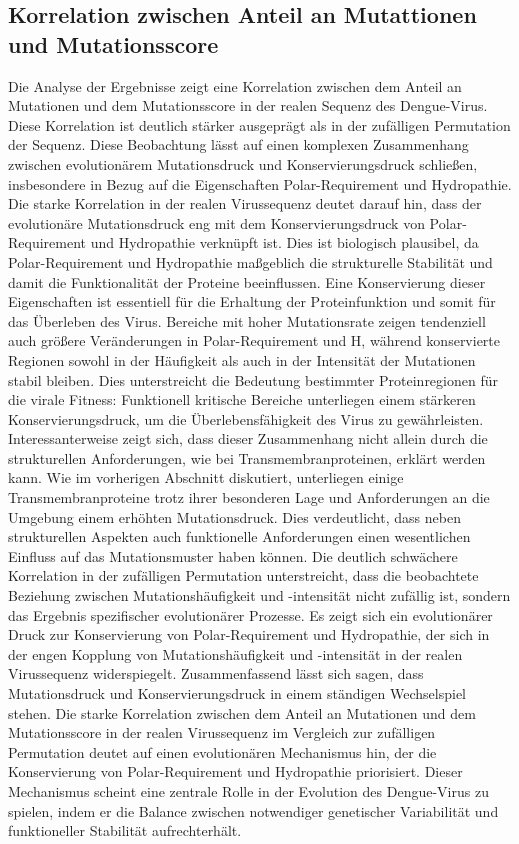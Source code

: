 \documentclass[german,version-2022-01]{uzl-thesis}
\begin{document}
\subsection{Korrelation zwischen Anteil an Mutattionen und Mutationsscore}
Die Analyse der Ergebnisse zeigt eine Korrelation zwischen dem Anteil an Mutationen und dem Mutationsscore in der realen Sequenz des Dengue-Virus. Diese Korrelation ist deutlich st\"arker ausgepr\"agt als in der zuf\"alligen Permutation der Sequenz. Diese Beobachtung l\"asst auf einen komplexen Zusammenhang zwischen evolution\"arem Mutationsdruck und Konservierungsdruck schlie\ss{}en, insbesondere in Bezug auf die Eigenschaften Polar-Requirement und Hydropathie. Die starke Korrelation in der realen Virussequenz deutet darauf hin, dass der evolution\"are Mutationsdruck eng mit dem Konservierungsdruck von Polar-Requirement und Hydropathie verkn\"upft ist. Dies ist biologisch plausibel, da Polar-Requirement und Hydropathie ma\ss{}geblich die strukturelle Stabilit\"at und damit die Funktionalit\"at der Proteine beeinflussen. Eine Konservierung dieser Eigenschaften ist essentiell f\"ur die Erhaltung der Proteinfunktion und somit f\"ur das \"Uberleben des Virus. Bereiche mit hoher Mutationsrate zeigen tendenziell auch gr\"o\ss{}ere Ver\"anderungen in Polar-Requirement und H, w\"ahrend konservierte Regionen sowohl in der H\"aufigkeit als auch in der Intensit\"at der Mutationen stabil bleiben. Dies unterstreicht die Bedeutung bestimmter Proteinregionen f\"ur die virale Fitness: Funktionell kritische Bereiche unterliegen einem st\"arkeren Konservierungsdruck, um die \"Uberlebensf\"ahigkeit des Virus zu gew\"ahrleisten. Interessanterweise zeigt sich, dass dieser Zusammenhang nicht allein durch die strukturellen Anforderungen, wie bei Transmembranproteinen, erkl\"art werden kann. Wie im vorherigen Abschnitt diskutiert, unterliegen einige Transmembranproteine trotz ihrer besonderen Lage und Anforderungen an die Umgebung einem erh\"ohten Mutationsdruck. Dies verdeutlicht, dass neben strukturellen Aspekten auch funktionelle Anforderungen einen wesentlichen Einfluss auf das Mutationsmuster haben k\"onnen. Die deutlich schw\"achere Korrelation in der zuf\"alligen Permutation unterstreicht, dass die beobachtete Beziehung zwischen Mutationsh\"aufigkeit und -intensit\"at nicht zuf\"allig ist, sondern das Ergebnis spezifischer evolution\"arer Prozesse. Es zeigt sich ein evolution\"arer Druck zur Konservierung von Polar-Requirement und Hydropathie, der sich in der engen Kopplung von Mutationsh\"aufigkeit und -intensit\"at in der realen Virussequenz widerspiegelt. Zusammenfassend l\"asst sich sagen, dass Mutationsdruck und Konservierungsdruck in einem st\"andigen Wechselspiel stehen. Die starke Korrelation zwischen dem Anteil an Mutationen und dem Mutationsscore in der realen Virussequenz im Vergleich zur zuf\"alligen Permutation deutet auf einen evolution\"aren Mechanismus hin, der die Konservierung von Polar-Requirement und Hydropathie priorisiert. Dieser Mechanismus scheint eine zentrale Rolle in der Evolution des Dengue-Virus zu spielen, indem er die Balance zwischen notwendiger genetischer Variabilit\"at und funktioneller Stabilit\"at aufrechterh\"alt.
\end{document}
